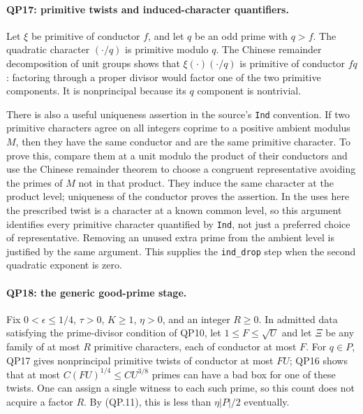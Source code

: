 \paragraph{QP17: primitive twists and induced-character quantifiers.}
Let $\xi$ be primitive of conductor $f$, and let $q$ be an odd prime
with $q>f$.  The quadratic character $(\cdot/q)$ is primitive modulo
$q$.  The Chinese remainder decomposition of unit groups shows that
$\xi(\cdot)(\cdot/q)$ is primitive of conductor $fq$: factoring through
a proper divisor would factor one of the two primitive components.
It is nonprincipal because its $q$ component is nontrivial.

There is also a useful uniqueness assertion in the source's
\texttt{Ind} convention.  If two primitive characters agree on all
integers coprime to a positive ambient modulus $M$, then they have the same
conductor and are the same primitive character.  To prove this, compare
them at a unit modulo the product of their conductors and use the
Chinese remainder theorem to choose a congruent representative avoiding
the primes of $M$ not in that product.  They induce the same character
at the product level; uniqueness of the conductor proves the assertion.
In the uses here the prescribed twist is a character at a known common
level, so this argument identifies every primitive character quantified
by \texttt{Ind}, not just a preferred choice of representative.
Removing an unused extra prime from the ambient level is justified by
the same argument.  This supplies the \texttt{ind\_drop} step when the
second quadratic exponent is zero.

\paragraph{QP18: the generic good-prime stage.}
Fix $0<\epsilon\le1/4$, $\tau>0$, $K\ge1$, $\eta>0$, and an integer
$R\ge0$.  In admitted data satisfying the prime-divisor condition of
QP10, let $1\le F\le\sqrt U$ and let $\Xi$ be any family of at most
$R$ primitive characters, each of conductor at most $F$.
For $q\in P$, QP17 gives nonprincipal primitive twists of conductor at
most $FU$; QP16 shows that at most $C(FU)^{1/4}\le CU^{3/8}$ primes
can have a bad box for one of these twists.
One can assign a single witness to each such prime, so this count does
not acquire a factor $R$.
By (QP.11), this is less than $\eta|P|/2$ eventually.

